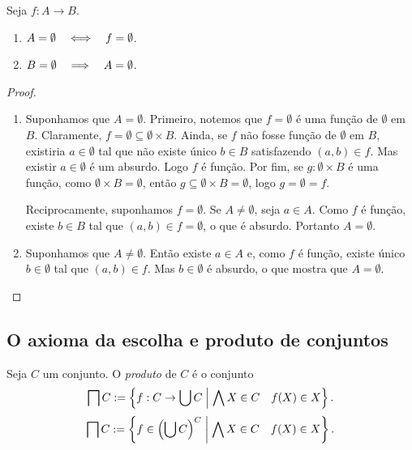 \begin{proposition}
	Seja $f: A \to B$.
	\begin{enumerate}
	\item $A=\emptyset \quad \Longleftrightarrow \quad f=\emptyset$.
	\item $B=\emptyset \quad \Longrightarrow \quad A=\emptyset$.
	\end{enumerate}
\end{proposition}
\begin{proof}
	\begin{enumerate}
	\item Suponhamos que $A=\emptyset$. Primeiro, notemos que $f=\emptyset$ é uma função de $\emptyset$ em $B$. Claramente, $f = \emptyset \subseteq \emptyset \times B$. Ainda, se $f$ não fosse função de $\emptyset$ em $B$, existiria $a \in \emptyset$ tal que não existe único $b \in B$ satisfazendo $(a,b) \in f$. Mas existir $a \in \emptyset$ é um absurdo. Logo $f$ é função. Por fim, se $g: \emptyset \times B$ é uma função, como $\emptyset \times B = \emptyset$, então $g \subseteq \emptyset \times B = \emptyset$, logo $g=\emptyset=f$.
	
	Reciprocamente, suponhamos $f=\emptyset$. Se $A \neq \emptyset$, seja $a \in A$. Como $f$ é função, existe $b \in B$ tal que $(a,b) \in f=\emptyset$, o que é absurdo. Portanto $A=\emptyset$.
	
	\item Suponhamos que $A \neq \emptyset$. Então existe $a \in A$ e, como $f$ é função, existe único $b \in \emptyset$ tal que $(a,b) \in f$. Mas $b \in \emptyset$ é absurdo, o que mostra que $A = \emptyset$.
	\end{enumerate}
\end{proof}

\subsection*{O axioma da escolha e produto de conjuntos}

\begin{definition}
Seja $C$ um conjunto. O \emph{produto} de $C$ é o conjunto
	\begin{equation*}
	\prod C := \set{f: C \to \bigcup C }{\forall X \in C \quad f(X) \in X}.
	\end{equation*}
	\begin{equation*}
	\prod C := \set{f \in \left(\bigcup C\right)^C }{\forall X \in C \quad f(X) \in X}.
	\end{equation*}
\end{definition}

